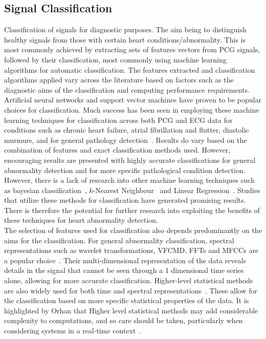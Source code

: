 \documentclass[titlepage, 12pt]{scrartcl} \usepackage{enumitem}
\begin{document}
\subsection{Signal Classification}
Classification of signals for diagnostic purposes.  The aim being to
distinguish healthy signals from those with certain heart
conditions/abnormality. This is most commonly achieved by extracting
sets of features vectors from PCG signals, followed by their
classification, most commonly using machine learning algorithms for
automatic classification. The features extracted and classification
algorithms applied vary across the literature based on factors such as
the diagnostic aims of the classification and computing performance
requirements.\\

Artificial neural networks and support vector machines have proven to
be popular choices for classification. Much success has been seen in
employing these machine learning techniques for classification across
both PCG and ECG data for conditions such as chronic heart failure,
atrial fibrillation and flutter, diastolic murmurs, and for general
pathology detection~\parencite{Cathers1995, Wu1995, Bung2000,
Lubaib2016, Maji2014, Ari2010, Maglogiannis2009}. Results do vary based
on the combination of features and exact classification methods used.
However, encouraging results are presented with highly accurate
classifications for general abnormality detection and for more specific
pathological condition detection.\\

However, there is a lack of research into other machine learning
techniques such as bayesian classification~\parencite{Lubaib2016},
$k$-Nearest Neighbour~\parencite{Quiceno-Manrique2010a, Lubaib2016} and
Linear Regression~\parencite{Orhan2013}. Studies that utilize these
methods for classification have generated promising results.  There is
therefore the potential for further research into exploiting the
benefits of these techniques for heart abnormality detection.\\

The selection of features used for classification also depends
predominantly on the aims for the classification. For general
abnormality classification, spectral representations such as wavelet
transformations, VFCMD, FFTs and MFCCs are a popular
choice~\parencite{Bung2000, Wu1995, Yaghouby2009, Dash2009}. Their
multi-dimensional representation of the data reveals details in the
signal that cannot be seen through a 1 dimensional time series alone,
allowing for more accurate classification. Higher-level statistical
methods are also widely used for both time and spectral
representations~\parencite{Bung2000, Quiceno-Manrique2010a,
Schmidt2015, Dash2009, Yaghouby2009}. These allow for the
classification based on more specific statistical properties of the
data. It is highlighted by Orhan that Higher level statistical methods
may add considerable complexity to computations, and so care should be
taken, particularly when considering systems in a real-time
context~\citeyearpar{Orhan2013}.
\end{document}
